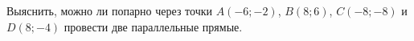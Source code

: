 \begin{ex}
	\begin{condition}
		Выяснить, можно ли попарно через точки \( A(-6;-2) \), \( B(8;6) \), \( C(-8;-8) \) и \( D(8;-4) \) провести две параллельные прямые.
	\end{condition}
\end{ex}